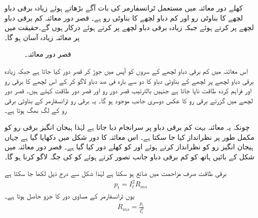 کھلے دور معائنہ میں مستعمل  ٹرانسفارمر کی بات آگے بڑھاتے ہوئے زیادہ برقی دباو لچھے کا بناوٹی رو  اور کم  دباو  لچھے کا بناوٹی رو  ہے۔ قصر دور معائنہ کم برقی دباو لچھے پر کرتے ہوئے   جبکہ زیادہ برقی دباو لچھے پر  کرتے ہوئے   درکار ہوں گے۔حقیقت میں  پر معائنہ زیادہ آسان ہو گا۔
\begin{figure}
\centering
\caption{قصر دور معائنہ۔}
\label{شکل_ٹرانسفارمر_کسر_دور_معائنہ}
\end{figure}

اس معائنہ میں کم برقی دباو لچھے کے  سروں کو آپس میں جوڑ کر قصر دور کیا جاتا ہے  جبکہ زیادہ برقی دباو لچھے پر لچھے کے بناوٹی دباو کا دو سے بارہ  فی صد دباو   لاگو کر کے اس لچھے کا  برقی رو  اور فراہم کردہ طاقت  ناپا جاتا ہے جنہیں بالترتیب قصر دور رو اور قصر دور طاقت کہتے ہیں۔ قصر دور لچھے میں  گزرتے برقی رو  کا عکس دوسری جانب  موجود ہو گا۔ یہ برقی رو ٹرانسفارمر کے بناوٹی برقی رو کے لگ بھگ ہوتا ہے۔

 چونکہ یہ معائنہ بہت کم برقی دباو پر سرانجام دیا  جاتا ہے لہٰذا  ہیجان انگیز برقی رو کو مکمل طور پر نظرانداز کیا جا سکتا ہے۔ اس معائنہ کا دور شکل  میں دکھایا گیا ہے جہاں ہیجان انگیز رو کو نظرانداز کرتے ہوئے  اور  کو کھلے دور کیا گیا ہے۔  قصر دور معائنہ میں  شکل  کے بائیں ہاتھ کو کم برقی دباو  جانب تصور کرتے ہوئے   کو   کی جگہ لاگو کرنا ہو گا۔

برقی طاقت صرف مزاحمت میں  ضائع ہو سکتا ہے لہٰذا  شکل  سے درج ذیل لکھا جا سکتا ہے
\begin{align*}
p_t=I_t^2 R_{ms}
\end{align*}
یوں ٹرانسفارمر کے مساوی دور کا جزو  حاصل ہوتا ہے۔
\begin{align}\label{مساوات_ٹرانسفارمر_کسر_دور_مزاحمت_حاصل}
R_{ms}=\frac{p_t}{I_t^2}
\end{align}

